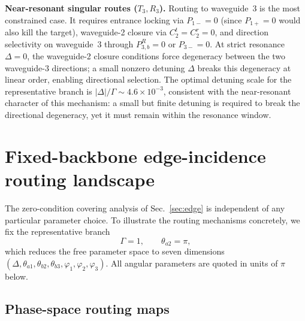\documentclass[aps,pra,reprint,superscriptaddress,nofootinbib,longbibliography,floatfix]{revtex4-2}
\newcommand{\Del}{\Delta}
\newcommand{\Gam}{\Gamma}
\newcommand{\ph}{\varphi}
\newcommand{\thaone}{\theta_{a1}}
\newcommand{\thatwo}{\theta_{a2}}
\newcommand{\thbtwo}{\theta_{b2}}
\newcommand{\thbthree}{\theta_{b3}}
\newcommand{\Poneplus}{P_{1+}}
\newcommand{\Poneminus}{P_{1-}}
\begin{document}
\textbf{Near-resonant singular routes ($T_3,R_3$).}
Routing to waveguide~3 is the most constrained case.
It requires entrance locking via $\Poneminus=0$ (since $\Poneplus=0$ would also kill the target), waveguide-2 closure via $C_2^t=C_2^r=0$, and direction selectivity on waveguide~3 through $P_{3,b}^{R}=0$ or $P_{3-}=0$.
At strict resonance $\Del=0$, the waveguide-2 closure conditions force degeneracy between the two waveguide-3 directions; a small nonzero detuning $\Del$ breaks this degeneracy at linear order, enabling directional selection.
The optimal detuning scale for the representative branch is $|\Del|/\Gam\sim 4.6\times10^{-3}$, consistent with the near-resonant character of this mechanism: a small but finite detuning is required to break the directional degeneracy, yet it must remain within the resonance window.

\section{Fixed-backbone edge-incidence routing landscape}
\label{sec:routing}

The zero-condition covering analysis of Sec.~\ref{sec:edge} is independent of any particular parameter choice.
To illustrate the routing mechanisms concretely, we fix the representative branch
\begin{equation}
  \boxed{\Gam=1,\qquad \thatwo=\pi,}
\end{equation}
which reduces the free parameter space to seven dimensions $(\Delta,\thaone,\thbtwo,\thbthree,\ph_1,\ph_2,\ph_3)$.
All angular parameters are quoted in units of $\pi$ below.

\subsection{Phase-space routing maps}
\end{document}

